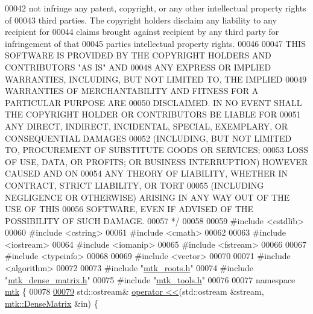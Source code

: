 \begin{DoxyCode}
00042 \textcolor{comment}{not infringe any patent, copyright, or any other intellectual property rights of}
00043 \textcolor{comment}{third parties. The copyright holders disclaim any liability to any recipient for}
00044 \textcolor{comment}{claims brought against recipient by any third party for infringement of that}
00045 \textcolor{comment}{parties intellectual property rights.}
00046 \textcolor{comment}{}
00047 \textcolor{comment}{THIS SOFTWARE IS PROVIDED BY THE COPYRIGHT HOLDERS AND CONTRIBUTORS "AS IS" AND}
00048 \textcolor{comment}{ANY EXPRESS OR IMPLIED WARRANTIES, INCLUDING, BUT NOT LIMITED TO, THE IMPLIED}
00049 \textcolor{comment}{WARRANTIES OF MERCHANTABILITY AND FITNESS FOR A PARTICULAR PURPOSE ARE}
00050 \textcolor{comment}{DISCLAIMED. IN NO EVENT SHALL THE COPYRIGHT HOLDER OR CONTRIBUTORS BE LIABLE FOR}
00051 \textcolor{comment}{ANY DIRECT, INDIRECT, INCIDENTAL, SPECIAL, EXEMPLARY, OR CONSEQUENTIAL DAMAGES}
00052 \textcolor{comment}{(INCLUDING, BUT NOT LIMITED TO, PROCUREMENT OF SUBSTITUTE GOODS OR SERVICES;}
00053 \textcolor{comment}{LOSS OF USE, DATA, OR PROFITS; OR BUSINESS INTERRUPTION) HOWEVER CAUSED AND ON}
00054 \textcolor{comment}{ANY THEORY OF LIABILITY, WHETHER IN CONTRACT, STRICT LIABILITY, OR TORT}
00055 \textcolor{comment}{(INCLUDING NEGLIGENCE OR OTHERWISE) ARISING IN ANY WAY OUT OF THE USE OF THIS}
00056 \textcolor{comment}{SOFTWARE, EVEN IF ADVISED OF THE POSSIBILITY OF SUCH DAMAGE.}
00057 \textcolor{comment}{*/}
00058 
00059 \textcolor{preprocessor}{#include <cstdlib>}
00060 \textcolor{preprocessor}{#include <cstring>}
00061 \textcolor{preprocessor}{#include <cmath>}
00062 
00063 \textcolor{preprocessor}{#include <iostream>}
00064 \textcolor{preprocessor}{#include <iomanip>}
00065 \textcolor{preprocessor}{#include <fstream>}
00066 
00067 \textcolor{preprocessor}{#include <typeinfo>}
00068 
00069 \textcolor{preprocessor}{#include <vector>}
00070 
00071 \textcolor{preprocessor}{#include <algorithm>}
00072 
00073 \textcolor{preprocessor}{#include "\hyperlink{mtk__roots_8h}{mtk\_roots.h}"}
00074 \textcolor{preprocessor}{#include "\hyperlink{mtk__dense__matrix_8h}{mtk\_dense\_matrix.h}"}
00075 \textcolor{preprocessor}{#include "\hyperlink{mtk__tools_8h}{mtk\_tools.h}"}
00076 
00077 \textcolor{keyword}{namespace }\hyperlink{namespacemtk}{mtk} \{
00078 
\hypertarget{mtk__dense__matrix_8cc_source_l00079}{}\hyperlink{namespacemtk_ad3bcf52cda59ddb5fc7b4bdce76c46dc}{00079} std::ostream& \hyperlink{namespacemtk_ad3bcf52cda59ddb5fc7b4bdce76c46dc}{operator <<}(std::ostream &stream, \hyperlink{classmtk_1_1DenseMatrix}{mtk::DenseMatrix} &in) \{

\end{DoxyCode}
